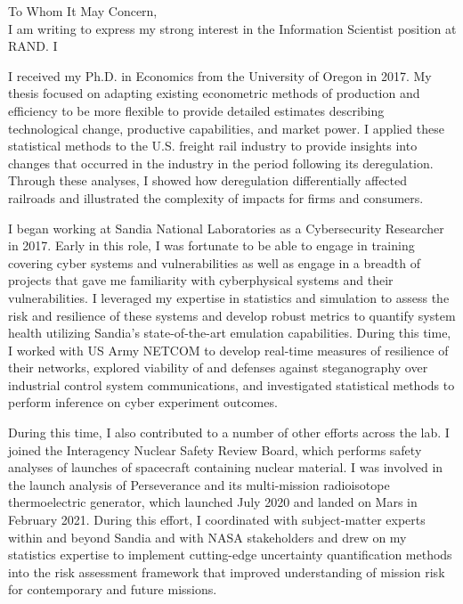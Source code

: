 \documentclass[11pt]{article}
\begin{document}
\noindent To Whom It May Concern,\\

\noindent I am writing to express my strong interest in the Information Scientist position at RAND. I 

I received my Ph.D. in Economics from the University of Oregon in 2017. My thesis focused on adapting existing econometric methods of production and efficiency to be more flexible to provide detailed estimates describing technological change, productive capabilities, and market power. I applied these statistical methods to the U.S. freight rail industry to provide insights into changes that occurred in the industry in the period following its deregulation. Through these analyses, I showed how deregulation differentially affected railroads and illustrated the complexity of impacts for firms and consumers. 

I began working at Sandia National Laboratories as a Cybersecurity Researcher in 2017. Early in this role, I was fortunate to be able to engage in training covering cyber systems and vulnerabilities as well as engage in a breadth of projects that gave me familiarity with cyberphysical systems and their vulnerabilities. I leveraged my expertise in statistics and simulation to assess the risk and resilience of these systems and develop robust metrics to quantify system health utilizing Sandia's state-of-the-art emulation capabilities. During this time, I worked with US Army NETCOM to develop real-time measures of resilience of their networks, explored viability of and defenses against steganography over industrial control system communications, and investigated statistical methods to perform inference on cyber experiment outcomes.

During this time, I also contributed to a number of other efforts across the lab. I joined the Interagency Nuclear Safety Review Board, which performs safety analyses of launches of spacecraft containing nuclear material. I was involved in the launch analysis of Perseverance and its multi-mission radioisotope thermoelectric generator, which launched July 2020 and landed on Mars in February 2021. During this effort, I coordinated with subject-matter experts within and beyond Sandia and with NASA stakeholders and drew on my statistics expertise to implement cutting-edge uncertainty quantification methods into the risk assessment framework that improved understanding of mission risk for contemporary and future missions.
\end{document}
